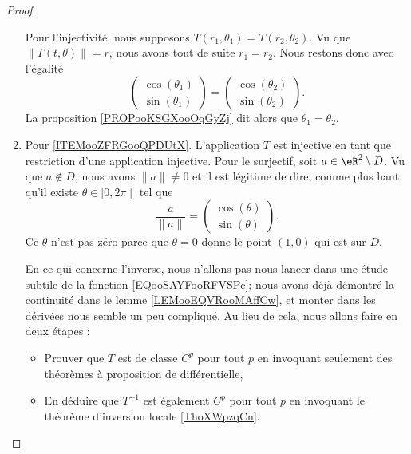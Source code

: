 \begin{proof}
\begin{enumerate}
            Pour l'injectivité, nous supposons \( T(r_1,\theta_1)=T(r_2,\theta_2)\). Vu que \( \| T(t,\theta) \|=r\), nous avons tout de suite \( r_1=r_2\). Nous restons donc avec l'égalité
            \begin{equation}
                \begin{pmatrix}
                    \cos(\theta_1)    \\ 
                    \sin(\theta_1)    
                \end{pmatrix}=\begin{pmatrix}
                    \cos(\theta_2)    \\ 
                    \sin(\theta_2)    
                \end{pmatrix}.
            \end{equation}
            La proposition \ref{PROPooKSGXooOqGyZj} dit alors que \( \theta_1=\theta_2\).
        \item
            Pour \ref{ITEMooZFRGooQPDUtX}. L'application \( T\) est injective en tant que restriction d'une application injective. Pour le surjectif, soit \( a\in \eR^2\setminus D\). Vu que \( a\notin D\), nous avons \( \| a \|\neq 0\) et il est légitime de dire, comme plus haut, qu'il existe \( \theta\in \mathopen[ 0 , 2\pi \mathclose[\) tel que
                \begin{equation}
                    \frac{ a }{ \| a \| }=\begin{pmatrix}
                        \cos(\theta)    \\ 
                        \sin(\theta)    
                    \end{pmatrix}.
                \end{equation}
                Ce \( \theta\) n'est pas zéro parce que \( \theta=0\) donne le point \( (1,0)\) qui est sur \( D\).

                En ce qui concerne l'inverse, nous n'allons pas nous lancer dans une étude subtile de la fonction \eqref{EQooSAYFooRFVSPc}; nous avons déjà démontré la continuité dans le lemme \ref{LEMooEQVRooMAffCw}, et monter dans les dérivées nous semble un peu compliqué. Au lieu de cela, nous allons faire en deux étapes :
                \begin{itemize}
                    \item Prouver que \( T\) est de classe \( C^p\) pour tout \( p\) en invoquant seulement des théorèmes à proposition de différentielle,
                    \item
                        En déduire que \( T^{-1}\) est également \( C^p\) pour tout \( p\) en invoquant le théorème d'inversion locale \ref{ThoXWpzqCn}.
                \end{itemize}


\end{enumerate}
\end{proof}
